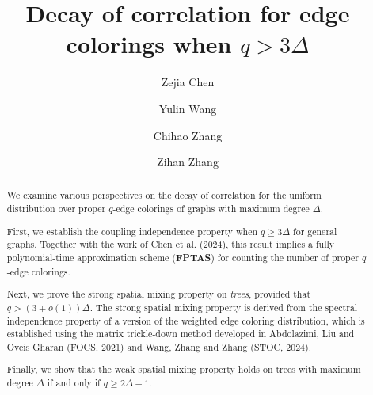 \documentclass[a4paper,11pt]{article}
\title{Decay of correlation for edge colorings when $q>3\Delta$}
\author[1]{Zejia Chen}
\author[1]{Yulin Wang}
\author[1]{Chihao Zhang}
\author[2]{Zihan Zhang}
\affil[1]{Shanghai Jiao Tong University}
\affil[2]{Graduate Institute for Advanced Studies, SOKENDAI}
\begin{document}
\maketitle

\begin{abstract}
    We examine various perspectives on the decay of correlation for the uniform distribution over proper $q$-edge colorings of graphs with maximum degree $\Delta$.

    First, we establish the coupling independence property when $q\ge 3\Delta$ for general graphs. Together with the work of Chen et al. (2024), this result implies a fully polynomial-time approximation scheme (\textbf{FPTAS}) for counting the number of proper $q$-edge colorings. 

    Next, we prove the strong spatial mixing property on \emph{trees}, provided that $q> (3+o(1))\Delta$. The strong spatial mixing property is derived from the spectral independence property of a version of the weighted edge coloring distribution, which is established using the matrix trickle-down method developed in Abdolazimi, Liu and Oveis Gharan (FOCS, 2021) and Wang, Zhang and Zhang (STOC, 2024).

    Finally, we show that the weak spatial mixing property holds on trees with maximum degree $\Delta$ if and only if $q\ge 2\Delta-1$.
\end{abstract}

\setcounter{tocdepth}{1}
\tableofcontents
\newpage












\appendix


\end{document}
